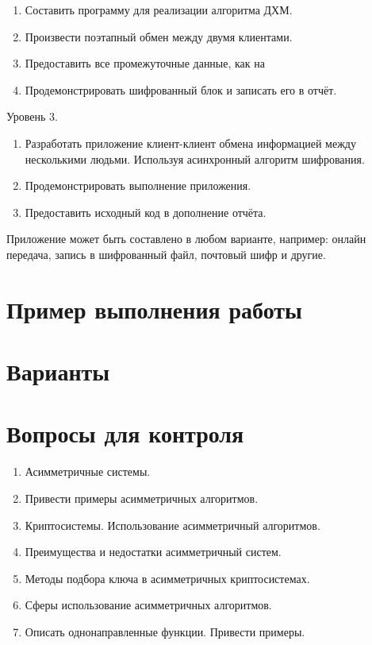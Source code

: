 \begin{enumerate}
  \item Составить программу для реализации алгоритма ДХМ.
  \item Произвести поэтапный обмен между двумя клиентами.
  \item Предоставить все промежуточные данные, как на 
  \item Продемонстрировать шифрованный блок и записать его в отчёт.
\end{enumerate}

\noindent Уровень 3.

\begin{enumerate}
  \item Разработать приложение клиент-клиент обмена информацией между
      несколькими людьми. Используя асинхронный алгоритм шифрования.
  \item Продемонстрировать выполнение приложения.
  \item Предоставить исходный код в дополнение отчёта.
\end{enumerate}
Приложение может быть составлено в любом варианте, например: онлайн передача,
запись в шифрованный файл, почтовый шифр и другие.
\section{Пример выполнения работы}\label{sect2_c}
%
\section{Варианты}\label{sect2_d}
%
\section{Вопросы для контроля}\label{sect2_e}
\begin{enumerate}
  \item Асимметричные системы.
  \item Привести примеры асимметричных алгоритмов.
  \item Криптосистемы. Использование асимметричный алгоритмов.
  \item Преимущества и недостатки асимметричный систем.
  \item Методы подбора ключа в асимметричных криптосистемах.
  \item Сферы использование асимметричных алгоритмов.
  \item Описать однонаправленные функции. Привести примеры.
\end{enumerate}
%

